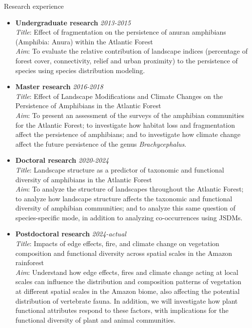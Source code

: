 \documentclass{resume}
\begin{document}

\begin{rSection}{Research experience}
\begin{itemize}
\item {\bf Undergraduate research} \hfill{\em 2013-2015}\\
{\it Title}: Effect of fragmentation on the persistence of anuran amphibians (Amphibia: Anura) within the Atlantic Forest\\
{\it Aim}: To evaluate the relative contribution of landscape indices (percentage of forest cover, connectivity, relief and urban proximity) to the persistence of species using species distribution modeling.

\item {\bf Master research} \hfill{\em 2016-2018}\\
{\it Title}: Effect of Landscape Modifications and Climate Changes on the Persistence of Amphibians in the Atlantic Forest\\
{\it Aim}: To present an assessment of the surveys of the amphibian communities for the Atlantic Forest; to investigate how habitat loss and fragmentation affect the persistence of amphibians; and to investigate how climate change affect the future persistence of the genus {\it Brachycephalus}.

\item {\bf Doctoral research} \hfill{\em 2020-2024}\\
{\it Title}: Landscape structure as a predictor of taxonomic and functional diversity of amphibians in the Atlantic Forest\\
{\it Aim}: To analyze the structure of landscapes throughout the Atlantic Forest; to analyze how landscape structure affects the taxonomic and functional diversity of amphibian communities; and to analyze this same question of species-specific mode, in addition to analyzing co-occurrences using JSDMs.

\item {\bf Postdoctoral research} \hfill{\em 2024-actual}\\
{\it Title}: Impacts of edge effects, fire, and climate change on vegetation composition and functional diversity across spatial scales in the Amazon rainforest\\
{\it Aim}: Understand how edge effects, fires and climate change acting at local scales can influence the distribution and composition patterns of vegetation at different spatial scales in the Amazon biome, also affecting the potential distribution of vertebrate fauna. In addition, we will investigate how plant functional attributes respond to these factors, with implications for the functional diversity of plant and animal communities.
\end{itemize}
\end{rSection}
\end{document}
